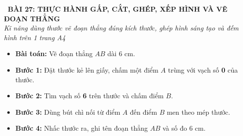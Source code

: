 \documentclass[11pt,a4paper]{article}
\begin{document}
\begin{tcolorbox}[
  enhanced,
  colback=violet!8!white,
  colframe=violet!70!black,
  arc=3mm, boxrule=1.2pt,
  left=3mm, right=3mm, top=2mm, bottom=2mm,
  halign=center
]
  {\LARGE\bfseries\color{violet!90!black}\faBookmark\ BÀI 27: THỰC HÀNH GẤP, CẮT, GHÉP, XẾP HÌNH VÀ VẼ ĐOẠN THẲNG}\\[1mm]
  {\itshape\footnotesize\color{black!75} Kĩ năng dùng thước vẽ đoạn thẳng đúng kích thước, ghép hình sáng tạo và đếm hình trên 1 trang A4}
\end{tcolorbox}

\vspace{-2mm}

\noindent
\begin{minipage}[t]{0.49\textwidth}\vspace{0pt}
\begin{tcolorbox}[
  enhanced,
  colback=violet!4!white,
  colframe=violet!75!black,
  arc=2mm, boxrule=0.8pt,
  left=2mm, right=2mm, top=1.8mm, bottom=1.8mm,
  title={\footnotesize\bfseries\color{white}\faKey\ 1. Cách vẽ đoạn thẳng có độ dài cho trước}
]
{\footnotesize
\begin{itemize}\setlength{\itemsep}{1pt}\setlength{\leftskip}{-2.5mm}
  \item \textbf{Bài toán:} Vẽ đoạn thẳng $AB$ dài $6\text{ cm}$.
  \item \textbf{Bước 1:} Đặt thước kẻ lên giấy, chấm một điểm $A$ trùng với vạch số \textbf{0} của thước.
  \item \textbf{Bước 2:} Tìm vạch số \textbf{6} trên thước và chấm điểm $B$.
  \item \textbf{Bước 3:} Dùng bút chì nối từ điểm $A$ đến điểm $B$ men theo mép thước.
  \item \textbf{Bước 4:} Nhấc thước ra, ghi tên đoạn thẳng $AB$ và số đo $6\text{ cm}$.
\end{itemize}
}
\end{tcolorbox}
\end{minipage}
\hfill
\end{document}
